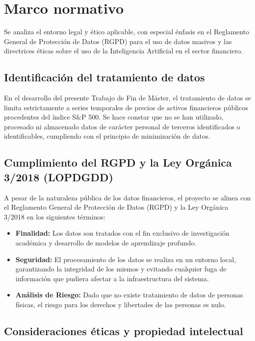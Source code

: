 \clearpage
\chapter{Marco normativo}

Se analiza el entorno legal y ético aplicable, con especial énfasis en el Reglamento General de Protección de Datos (RGPD) para el uso de datos masivos y las directrices éticas sobre el uso de la Inteligencia Artificial en el sector financiero.

\section{Identificación del tratamiento de datos}

En el desarrollo del presente Trabajo de Fin de Máster, el tratamiento de datos se limita estrictamente a series temporales de precios de activos financieros públicos procedentes del índice S\&P 500. Se hace constar que no se han utilizado, procesado ni almacenado datos de carácter personal de terceros identificados o identificables, cumpliendo con el principio de minimización de datos.

\section{Cumplimiento del RGPD y la Ley Orgánica 3/2018 (LOPDGDD)}

A pesar de la naturaleza pública de los datos financieros, el proyecto se alinea con el Reglamento General de Protección de Datos (RGPD) y la Ley Orgánica 3/2018 en los siguientes términos:

\begin{itemize}
    \item \textbf{Finalidad:} Los datos son tratados con el fin exclusivo de investigación académica y desarrollo de modelos de aprendizaje profundo.
    \item \textbf{Seguridad:} El procesamiento de los datos se realiza en un entorno local, garantizando la integridad de los mismos y evitando cualquier fuga de información que pudiera afectar a la infraestructura del sistema.
    \item \textbf{Análisis de Riesgo:} Dado que no existe tratamiento de datos de personas físicas, el riesgo para los derechos y libertades de las personas es nulo.
\end{itemize}

\section{Consideraciones éticas y propiedad intelectual}

